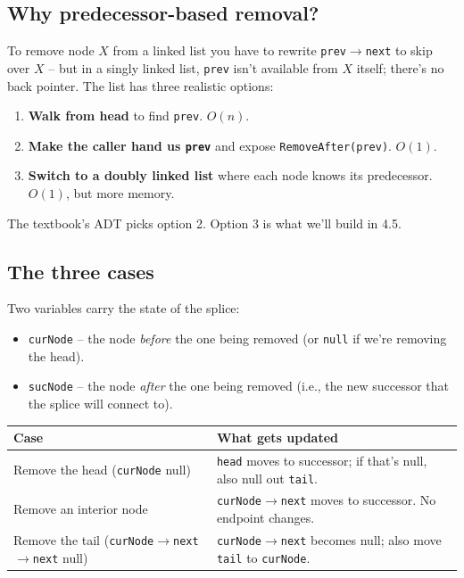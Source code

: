 \documentclass[11pt]{article}
\begin{document}
\subsection{Why predecessor-based removal?}

\begin{ideabox}
To remove node $X$ from a linked list you have to rewrite
\texttt{prev$\to$next} to skip over $X$ -- but in a singly linked
list, \texttt{prev} isn't available from $X$ itself; there's no back
pointer. The list has three realistic options:
\begin{enumerate}[leftmargin=*]
  \item \textbf{Walk from head} to find \texttt{prev}. $O(n)$.
  \item \textbf{Make the caller hand us \texttt{prev}} and expose
        \texttt{RemoveAfter(prev)}. $O(1)$.
  \item \textbf{Switch to a doubly linked list} where each node
        knows its predecessor. $O(1)$, but more memory.
\end{enumerate}
The textbook's ADT picks option 2. Option 3 is what we'll build in
4.5.
\end{ideabox}

\subsection{The three cases}

Two variables carry the state of the splice:
\begin{itemize}[leftmargin=*]
  \item \texttt{curNode} -- the node \emph{before} the one being
        removed (or \texttt{null} if we're removing the head).
  \item \texttt{sucNode} -- the node \emph{after} the one being
        removed (i.e., the new successor that the splice will
        connect to).
\end{itemize}

\begin{center}
\footnotesize
\renewcommand{\arraystretch}{1.3}
\begin{tabular}{@{}p{4cm}p{8cm}@{}}
\hline
\textbf{Case} & \textbf{What gets updated} \\
\hline
Remove the head (\texttt{curNode} null)  & \texttt{head} moves to successor; if that's null, also null out \texttt{tail}. \\
Remove an interior node                   & \texttt{curNode$\to$next} moves to successor. No endpoint changes. \\
Remove the tail (\texttt{curNode$\to$next$\to$next} null) & \texttt{curNode$\to$next} becomes null; also move \texttt{tail} to \texttt{curNode}. \\
\hline
\end{tabular}
\end{center}
\end{document}

